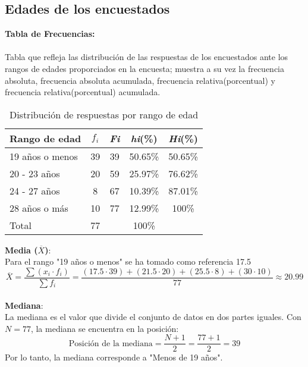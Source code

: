 \subsection{Edades de los encuestados}
	\noindent \textbf{Tabla de Frecuencias:} \\ \\
	Tabla que refleja las distribución de las respuestas de los encuestados ante los rangos de edades proporciados en la encuesta; muestra a su vez la frecuencia absoluta, frecuencia absoluta acumulada, frecuencia relativa(porcentual) y frecuencia relativa(porcentual) acumulada.
	
	\begin{table}[h!]
		\centering
		\renewcommand{\arraystretch}{1.5} %
		\begin{tabular}{l c c c c}
			\hline
			{Rango de edad} & {\(f_i\)} & \textit{Fi} & \textit{hi}(\%) & \textit{Hi}(\%)\\
			\hline
			19 años o menos   & 39 & 39 & 50.65\% & 50.65\%\\
			20 - 23 años       & 20 & 59 & 25.97\% & 76.62\%\\
			24 - 27 años       & 8  & 67 & 10.39\% & 87.01\%\\
			28 años o más      & 10 & 77 & 12.99\% & 100\%\\
			\hline
			Total			   & 77 & & 100\% \\
			\hline
		\end{tabular}
		\caption{Distribución de respuestas por rango de edad}
		\label{tabla:edad}
	\end{table}
	\noindent \textbf{Media (\(\overline{X}\))}: \\
	Para el rango "19 años o menos" se ha tomado como referencia 17.5
	\begin{equation*}
		\overline{X} = \frac{\sum (x_i \cdot f_i)}{\sum f_i} = \frac{(17.5 \cdot 39) + (21.5 \cdot 20) + (25.5 \cdot 8) + (30 \cdot 10)}{77} \approx 20.99
	\end{equation*}\\
	
	\noindent \textbf{Mediana}: \\ 
	La mediana es el valor que divide el conjunto de datos en dos partes iguales. Con \(N = 77\), la mediana se encuentra en la posición:
	\begin{equation*}
		\text{Posición de la mediana} = \frac{N + 1}{2} = \frac{77 + 1}{2} = 39
	\end{equation*}
	Por lo tanto, la mediana corresponde a "Menos de 19 años".\\
	
